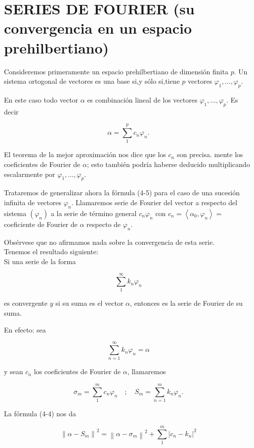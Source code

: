 \documentclass[10pt]{article}
\theoremstyle{plain}
\theoremstyle{definition}
\theoremstyle{remark}
\begin{document}
\section*{SERIES DE FOURIER (su convergencia en un espacio prehilbertiano)}
Consideremos primeramente un espacio prehilbertiano de dimensión finita $p$. Un sistema ortogonal de vectores es una base si,y sólo si,tiene $p$ vectores $\varphi_{1}, \ldots, \varphi_{p}$.

En este caso todo vector $\alpha$ es combinación lineal de los vectores $\varphi_{1}, \ldots, \varphi_{p}$. Es decir


\begin{equation*}
\alpha=\sum_{1}^{p} c_{n} \varphi_{n} . \tag{4-5}
\end{equation*}


El teorema de la mejor aproximación nos dice que los $c_{n}$ son precisa. mente los coeficientes de Fourier de $\alpha$; esto también podría haberse deducido multiplicando escalarmente por $\varphi_{1}, \ldots, \varphi_{p}$.

Trataremos de generalizar ahora la fórmula (4-5) para el caso de una sucesión infinita de vectores $\varphi_{n}$. Llamaremos serie de Fourier del vector a respecto del sistema $\left(\varphi_{n}\right)$ a la serie de término general $c_{n} \varphi_{n}$ con $c_{n}=\left\langle\alpha_{0}, \varphi_{n}\right\rangle=$ coeficiente de Fourier de $\alpha$ respecto de $\varphi_{n}$.

Obsérvese que no afirmamos nada sobre la convergencia de esta serie.\\
Tenemos el resultado siguiente:\\
Si una serie de la forma

$$
\sum_{1}^{\infty} k_{n} \varphi_{n}
$$

es convergente $y$ si su suma es el vector $\alpha$, entonces es la serie de Fourier de su suma.

En efecto: sea

$$
\sum_{n=1}^{\infty} k_{n} \varphi_{n}=\alpha
$$

y sean $c_{n}$ los coeficientes de Fourier de $\alpha$, llamaremos

$$
\sigma_{m}=\sum_{1}^{m} c_{n} \varphi_{n} \quad ; \quad S_{m}=\sum_{n=1}^{m} k_{n} \varphi_{n} .
$$

La fórmula (4-4) nos da

$$
\left\|\alpha-S_{m}\right\|^{2}=\left\|\alpha-\sigma_{m}\right\|^{2}+\sum_{1}^{m}\left|c_{n}-k_{n}\right|^{2}
$$
\end{document}
